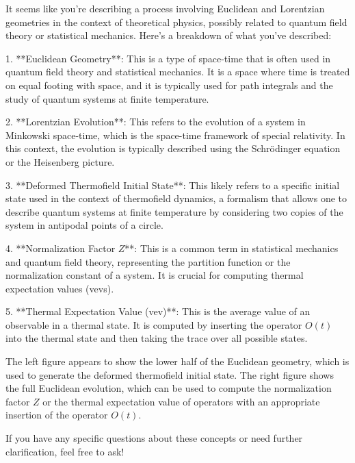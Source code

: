 It seems like you're describing a process involving Euclidean and Lorentzian geometries in the context of theoretical physics, possibly related to quantum field theory or statistical mechanics. Here's a breakdown of what you've described:

1. **Euclidean Geometry**: This is a type of space-time that is often used in quantum field theory and statistical mechanics. It is a space where time is treated on equal footing with space, and it is typically used for path integrals and the study of quantum systems at finite temperature.

2. **Lorentzian Evolution**: This refers to the evolution of a system in Minkowski space-time, which is the space-time framework of special relativity. In this context, the evolution is typically described using the Schrödinger equation or the Heisenberg picture.

3. **Deformed Thermofield Initial State**: This likely refers to a specific initial state used in the context of thermofield dynamics, a formalism that allows one to describe quantum systems at finite temperature by considering two copies of the system in antipodal points of a circle.

4. **Normalization Factor \( Z \)**: This is a common term in statistical mechanics and quantum field theory, representing the partition function or the normalization constant of a system. It is crucial for computing thermal expectation values (vevs).

5. **Thermal Expectation Value (vev)**: This is the average value of an observable in a thermal state. It is computed by inserting the operator \( O(t) \) into the thermal state and then taking the trace over all possible states.

The left figure appears to show the lower half of the Euclidean geometry, which is used to generate the deformed thermofield initial state. The right figure shows the full Euclidean evolution, which can be used to compute the normalization factor \( Z \) or the thermal expectation value of operators with an appropriate insertion of the operator \( O(t) \).

If you have any specific questions about these concepts or need further clarification, feel free to ask!